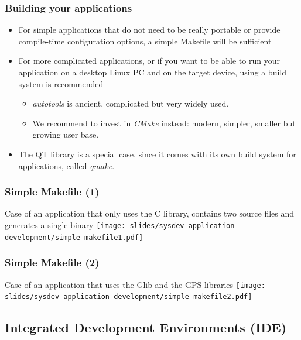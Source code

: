 \begin{frame}
  \frametitle{Building your applications}
  \begin{itemize}
  \item For simple applications that do not need to be really portable
    or provide compile-time configuration options, a simple Makefile
    will be sufficient
  \item For more complicated applications, or if you want to be able
    to run your application on a desktop Linux PC and on the target
    device, using a build system is recommended
    \begin{itemize}
    \item {\em autotools} is ancient, complicated but very
      widely used.
    \item We recommend to invest in {\em CMake} instead: modern, simpler, smaller but
      growing user base.
    \end{itemize}
  \item The QT library is a special case, since it comes with its own
    build system for applications, called {\em qmake}.
  \end{itemize}
\end{frame}

\begin{frame}[fragile]
  \frametitle{Simple Makefile (1)}
  Case of an application that only uses the C library, contains two source
  files and generates a single binary
  \vfill
  \texttt{[image: slides/sysdev-application-development/simple-makefile1.pdf]}\\
\end{frame}

\begin{frame}[fragile]
  \frametitle{Simple Makefile (2)}
  Case of an application that uses the Glib and the GPS libraries
  \vfill
  \texttt{[image: slides/sysdev-application-development/simple-makefile2.pdf]}\\
\end{frame}

\subsection[Source management \& IDEs]{Integrated
  Development Environments (IDE)}

